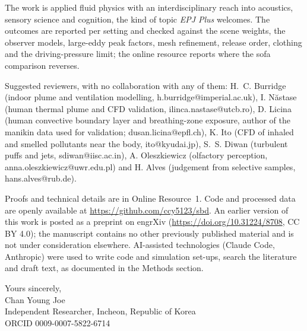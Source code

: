 \documentclass[11pt]{article}
\begin{document}
The work is applied fluid physics with an interdisciplinary reach into acoustics, sensory science and cognition, the
kind of topic \emph{EPJ Plus} welcomes. The outcomes are reported per setting and checked against the scene weights,
the observer models, large-eddy peak factors, mesh refinement, release order, clothing and the driving-pressure
limit; the online resource reports where the sofa comparison reverses.

Suggested reviewers, with no collaboration with any of them: H.~C. Burridge (indoor plume and ventilation modelling,
h.burridge@imperial.ac.uk), I. N\u{a}stase (human thermal plume and CFD validation, ilinca.nastase@utcb.ro),
D. Licina (human convective boundary layer and breathing-zone exposure, author of the manikin data used for
validation; dusan.licina@epfl.ch), K. Ito (CFD of inhaled and smelled pollutants near the body, ito@kyudai.jp), S.~S. Diwan
(turbulent puffs and jets, sdiwan@iisc.ac.in), A. Oleszkiewicz (olfactory perception, anna.oleszkiewicz@uwr.edu.pl)
and H. Alves (judgement from selective samples, hans.alves@rub.de).

Proofs and technical details are in Online Resource~1. Code and processed data are openly available at
\url{https://github.com/ccy5123/sbd}. An earlier version of this work is posted as a preprint on engrXiv
(\url{https://doi.org/10.31224/8708}, CC BY 4.0); the manuscript contains no other previously published material and
is not under consideration elsewhere. AI-assisted technologies (Claude Code, Anthropic) were used to write code and
simulation set-ups, search the literature and draft text, as documented in the Methods section.

Yours sincerely,\\[0.4em]
Chan Young Joe\\
Independent Researcher, Incheon, Republic of Korea\\
ORCID 0009-0007-5822-6714
\end{document}

